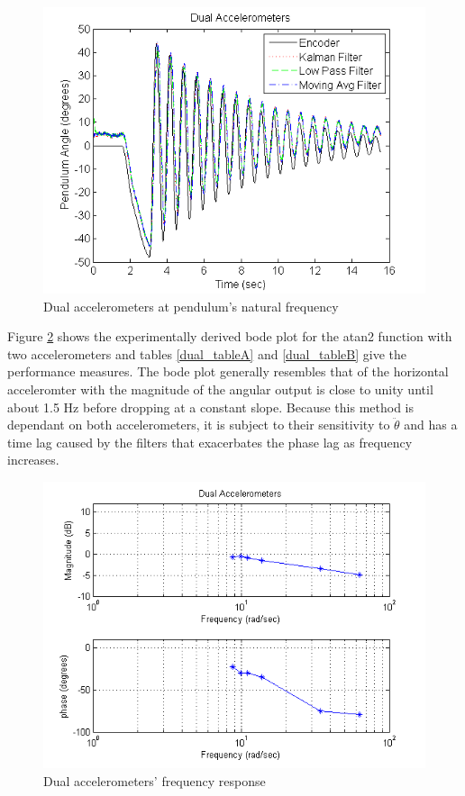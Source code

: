 \documentclass{article}
\theoremstyle{plain}
\theoremstyle{definition}
\theoremstyle{remark}
\begin{document}
\begin{figure}[hbt]
\begin{center}
\includegraphics[width = 12cm]{NormalMass_Dual.png}
\caption{Dual accelerometers at pendulum's natural frequency}
\label{normal_dual}
\end{center}
\end{figure}

Figure \ref{dualBode} shows the experimentally derived bode plot for the atan2 function with two accelerometers and tables \ref{dual_tableA} and \ref{dual_tableB} give the performance measures. The bode plot generally resembles that of the horizontal acceleromter with the magnitude of the angular output is close to unity until about 1.5 Hz before dropping at a constant slope. Because this method is dependant on both accelerometers, it is subject to their sensitivity to $\ddot{\theta}$ and has a time lag caused by the filters that exacerbates the phase lag as frequency increases. \\

\begin{figure}[hbt]
\begin{center}
\includegraphics[width = 14cm]{DualBode.png}
\caption{Dual accelerometers' frequency response}
\label{dualBode}
\end{center}
\end{figure}
\end{document}
